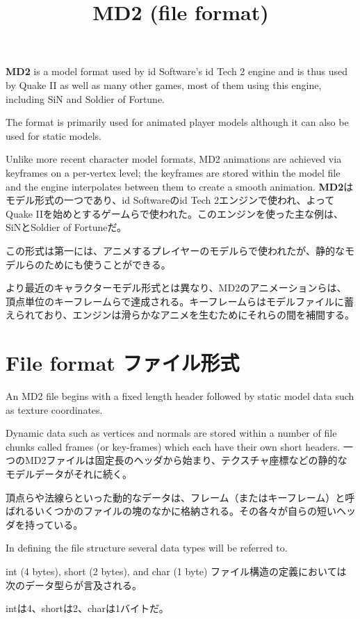 \documentclass[uplatex,dvipdfmx]{jsarticle} \usepackage{amsmath,amssymb,bm}
\title{MD2 (file format)} \author{} \date{}
\begin{document}
\maketitle


\begin{paracol}{2}
{\bf MD2} is a model format used by id Software's id Tech 2 engine and is thus used by Quake II as well as many other games, most of them using this engine, including SiN and Soldier of Fortune.

The format is primarily used for animated player models although it can also be used for static models.

Unlike more recent character model formats, MD2 animations are achieved via keyframes on a per-vertex level; the keyframes are stored within the model file and the engine interpolates between them to create a smooth animation.
\switchcolumn
{\bf MD2}はモデル形式の一つであり、id Softwareのid Tech 2エンジンで使われ、よってQuake IIを始めとするゲームらで使われた。このエンジンを使った主な例は、SiNとSoldier of Fortuneだ。

この形式は第一には、アニメするプレイヤーのモデルらで使われたが、静的なモデルらのためにも使うことができる。

より最近のキャラクターモデル形式とは異なり、MD2のアニメーションらは、頂点単位のキーフレームらで達成される。キーフレームらはモデルファイルに蓄えられており、エンジンは滑らかなアニメを生むためにそれらの間を補間する。
\end{paracol}
\section*{File format ファイル形式}
\begin{paracol}{2}
An MD2 file begins with a fixed length header followed by static model data such as texture coordinates.

Dynamic data such as vertices and normals are stored within a number of file chunks called frames (or key-frames) which each have their own short headers.
\switchcolumn
一つのMD2ファイルは固定長のヘッダから始まり、テクスチャ座標などの静的なモデルデータがそれに続く。

頂点らや法線らといった動的なデータは、フレーム（またはキーフレーム）と呼ばれるいくつかのファイルの塊のなかに格納される。その各々が自らの短いヘッダを持っている。
\end{paracol}
\vspace{\baselineskip}
\begin{paracol}{2}
In defining the file structure several data types will be referred to.

int (4 bytes), short (2 bytes), and  char (1 byte)
\switchcolumn
ファイル構造の定義においては次のデータ型らが言及される。

intは4、shortは2、charは1バイトだ。
\end{paracol}
\end{document}
